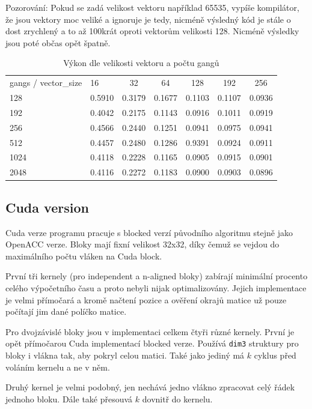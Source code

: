 \documentclass[11pt, fleqn]{article}
\begin{document}
Pozorování: Pokud se zadá velikost vektoru například 65535, vypíše kompilátor, že jsou vektory moc veliké a ignoruje je tedy, nicméně výsledný kód je stále o dost zrychlený a to až 100krát oproti vektorům velikosti 128. Nicméně výsledky jsou poté občas opět špatně. 

\begin{table}[tbp]
  \centering
  \caption{Výkon dle velikosti vektoru a počtu gangů}
  \label{fig:fw2}
  \def\arraystretch{2}
  \begin{tabular}{llccccc}
    gangs / vector\_size & 16 & 32 & 64 & 128 & 192 & 256 \\
    \rowcolor[HTML]{ECF4FF} 
    128  & 0.5910 & 0.3179 & 0.1677 & 0.1103 & 0.1107 & 0.0936 \\
    192  & 0.4042 & 0.2175 & 0.1143 & 0.0916 & 0.1011 & 0.0919 \\
    \rowcolor[HTML]{ECF4FF} 
    256  & 0.4566 & 0.2440 & 0.1251 & 0.0941 & 0.0975 & 0.0941 \\
    512  & 0.4457 & 0.2480 & 0.1286 & 0.9391 & 0.0924 & 0.0911 \\
    \rowcolor[HTML]{ECF4FF} 
    1024 & 0.4118 & 0.2228 & 0.1165 & 0.0905 & 0.0915 & 0.0901 \\
    2048 & 0.4116 & 0.2272 & 0.1183 & 0.0900 & 0.0903 & 0.0896
  \end{tabular}
\end{table}

\subsection{Cuda version}

Cuda verze programu pracuje s blocked verzí původního algoritmu stejně jako OpenACC verze. Bloky mají fixní velikost 32x32, díky čemuž se vejdou do maximálního počtu vláken na Cuda block.

První tři kernely (pro independent a n-aligned bloky) zabírají minimální procento celého výpočetního času a proto nebyli nijak optimalizovány. Jejich implementace je velmi přímočará a kromě načtení pozice a ověření okrajů matice už pouze počítají jim dané políčko matice.

Pro dvojzávislé bloky jsou v implementaci celkem čtyři různé kernely. První je opět přímočarou Cuda implementací blocked verze. Používá \lstinline{dim3} struktury pro bloky i vlákna tak, aby pokryl celou matici. Také jako jediný má $k$ cyklus před voláním kernelu a ne v něm.

Druhý kernel je velmi podobný, jen nechává jedno vlákno zpracovat celý řádek jednoho bloku. Dále také přesouvá $k$ dovnitř do kernelu.
\end{document}
